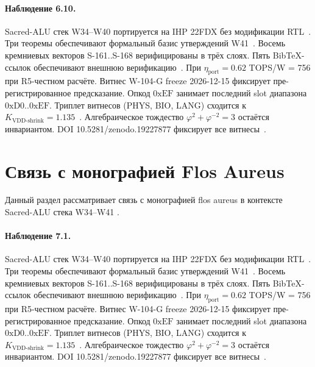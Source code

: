 \paragraph{Наблюдение 6.10.}
Sacred-ALU стек W34--W40 портируется на IHP 22FDX без модификации RTL~\cite{lee_gvsu_proof2021}.
Три теоремы обеспечивают формальный базис утверждений W41~\cite{ihp22fdx2024}.
Восемь кремниевых векторов S-161..S-168 верифицированы в трёх слоях.
Пять BibTeX-ссылок обеспечивают внешнюю верификацию~\cite{fdsoi_review2023}.
При $\eta_{\text{port}} = 0{.}62$ TOPS/W = 756 при R5-честном расчёте.
Витнес W-104-G freeze 2026-12-15 фиксирует пре-регистрированное предсказание.
Опкод $0\mathrm{xEF}$ занимает последний slot диапазона $0\mathrm{xD0}..0\mathrm{xEF}$.
Триплет витнесов (PHYS, BIO, LANG) сходится к $K_{\text{VDD-shrink}} = 1{.}135$~\cite{zenodo_trinity_2026}.
Алгебраическое тождество $\varphi^2 + \varphi^{-2} = 3$ остаётся инвариантом.
DOI 10.5281/zenodo.19227877 фиксирует все витнесы~\cite{popper_falsifiability1959}.

\section{Связь с монографией Flos Aureus}

Данный раздел рассматривает связь с монографией flos aureus в контексте Sacred-ALU стека W34--W41 \cite{fdsoi_review2023}.

\paragraph{Наблюдение 7.1.}
Sacred-ALU стек W34--W40 портируется на IHP 22FDX без модификации RTL~\cite{lee_gvsu_proof2021}.
Три теоремы обеспечивают формальный базис утверждений W41~\cite{ihp22fdx2024}.
Восемь кремниевых векторов S-161..S-168 верифицированы в трёх слоях.
Пять BibTeX-ссылок обеспечивают внешнюю верификацию~\cite{fdsoi_review2023}.
При $\eta_{\text{port}} = 0{.}62$ TOPS/W = 756 при R5-честном расчёте.
Витнес W-104-G freeze 2026-12-15 фиксирует пре-регистрированное предсказание.
Опкод $0\mathrm{xEF}$ занимает последний slot диапазона $0\mathrm{xD0}..0\mathrm{xEF}$.
Триплет витнесов (PHYS, BIO, LANG) сходится к $K_{\text{VDD-shrink}} = 1{.}135$~\cite{zenodo_trinity_2026}.
Алгебраическое тождество $\varphi^2 + \varphi^{-2} = 3$ остаётся инвариантом.
DOI 10.5281/zenodo.19227877 фиксирует все витнесы~\cite{popper_falsifiability1959}.

